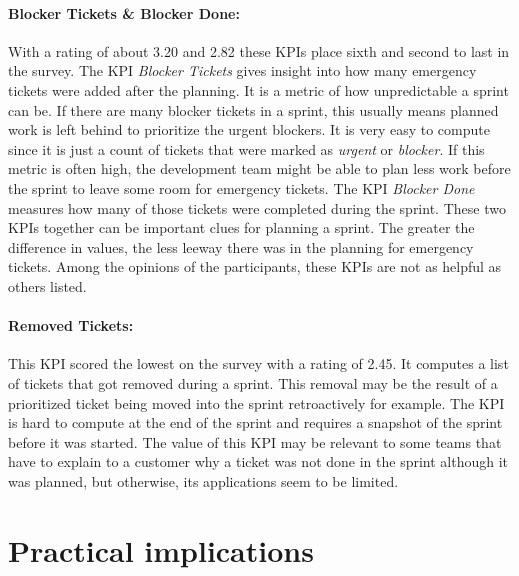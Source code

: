 \paragraph{\textbf{Blocker Tickets \& Blocker Done}:} With a rating of about 3.20 and 2.82 these KPIs place sixth and second to last in the survey. The KPI \textit{Blocker Tickets} gives insight into how many emergency tickets were added after the planning. It is a metric of how unpredictable a sprint can be. If there are many blocker tickets in a sprint, this usually means planned work is left behind to prioritize the urgent blockers. It is very easy to compute since it is just a count of tickets that were marked as \textit{urgent} or \textit{blocker}. If this metric is often high, the development team might be able to plan less work before the sprint to leave some room for emergency tickets. The KPI \textit{Blocker Done} measures how many of those tickets were completed during the sprint. These two KPIs together can be important clues for planning a sprint. The greater the difference in values, the less leeway there was in the planning for emergency tickets. Among the opinions of the participants, these KPIs are not as helpful as others listed. 

\paragraph{\textbf{Removed Tickets}:} This KPI scored the lowest on the survey with a rating of 2.45. It computes a list of tickets that got removed during a sprint. This removal may be the result of a prioritized ticket being moved into the sprint retroactively for example. The KPI is hard to compute at the end of the sprint and requires a snapshot of the sprint before it was started. The value of this KPI may be relevant to some teams that have to explain to a customer why a ticket was not done in the sprint although it was planned, but otherwise, its applications seem to be limited.

\section{Practical implications}

